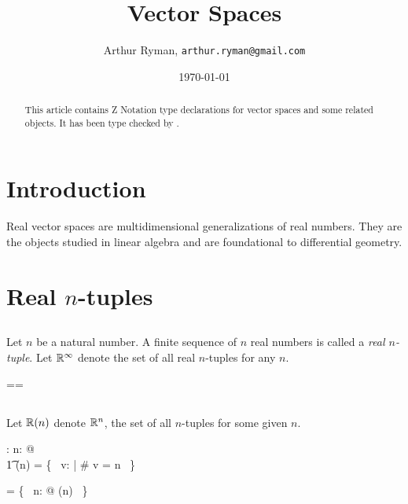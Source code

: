 \documentclass[11pt, oneside]{article}
\title{Vector Spaces}
\author{Arthur Ryman, {\tt arthur.ryman@gmail.com}}
\date{\today}
\begin{document}
\maketitle

\begin{abstract}
This article contains Z Notation type declarations for vector spaces and some related objects.
It has been type checked by \fuzz.
\end{abstract}

\section{Introduction}

Real vector spaces are multidimensional generalizations of real numbers.
They are the objects studied in linear algebra and are foundational to differential geometry.

\section{Real $n$-tuples}

\subsection{}

Let $n$ be a natural number.
A finite sequence of $n$ real numbers is called a {\it real $n$-tuple}.
Let $\mathbb{R}^\infty$ denote the set of all real $n$-tuples for any $n$.

\begin{zed}
	\Rinf == \seq \R
\end{zed}

\subsection{}

Let $\mathbb{R}(n)$ denote $\mathbb{R}^n$, the set of all $n$-tuples for some given $n$.
\begin{axdef}
	\Rtuples: \nat \fun \power \Rinf
\where
	\forall n: \nat @ \\
	\t1	\Rtuples(n) = \{~ v: \Rinf | \# v = n ~\}
\end{axdef}

\begin{remark}

\begin{zed}
	\Rinf = \bigcup \{~ n: \nat @ \Rtuples(n) ~\}
\end{zed}

\end{remark}
\end{document}

